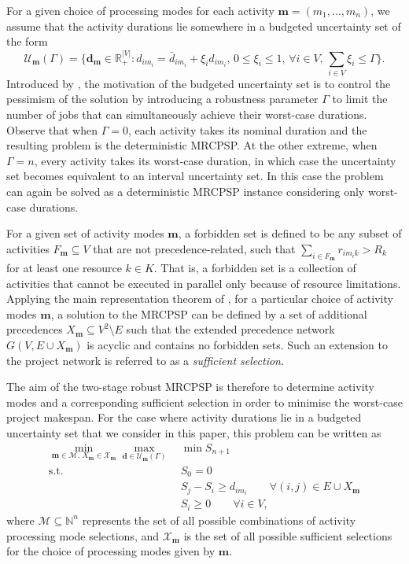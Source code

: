\documentclass[a4paper,abstracton]{scrartcl}
\newcommand{\M}{{\mathcal{M}}}
\newcommand{\U}{{\mathcal{U}}}
\newcommand{\X}{{\mathcal{X}}}
\begin{document}
For a given choice of processing modes for each activity $\bm{m}=(m_1,\dots,m_n)$, we assume that the activity durations lie somewhere in a budgeted uncertainty set of the form
$$\U_{\bm{m}}(\Gamma)=\Bigg\{\bm{d}_{\bm{m}}\in\mathbb{R}_+^{|V|}:d_{im_i}=\bar{d}_{im_i}+\xi_i\hat{d}_{im_i},\,0\leq \xi_i \leq 1,\,\forall i\in V,\,\sum_{i\in V}\xi_i \leq \Gamma\Bigg\}.$$
Introduced by \cite{bertsimas2004price}, the motivation of the budgeted uncertainty set is to control the pessimism of the solution by introducing a robustness parameter $\Gamma$ to limit the number of jobs that can simultaneously achieve their worst-case durations. Observe that when $\Gamma=0$, each activity takes its nominal duration and the resulting problem is the deterministic MRCPSP. At the other extreme, when $\Gamma=n$, every activity takes its worst-case duration, in which case the uncertainty set becomes equivalent to an interval uncertainty set. In this case the problem can again be solved as a deterministic MRCPSP instance considering only worst-case durations.

For a given set of activity modes $\bm{m}$, a forbidden set is defined to be any subset of activities $F_{\bm{m}}\subseteq V$ that are not precedence-related, such that $\sum_{i\in F_{\bm{m}}}r_{im_ik}>R_k$ for at least one resource $k\in K$. That is, a forbidden set is a collection of activities that cannot be executed in parallel only because of resource limitations. Applying the main representation theorem of \cite{bartusch1988scheduling}, for a particular choice of activity modes $\bm{m}$, a solution to the MRCPSP can be defined by a set of additional precedences $X_{\bm{m}}\subseteq V^2\setminus E$ such that the extended precedence network $G(V,E\cup X_{\bm{m}})$ is acyclic and contains no forbidden sets. Such an extension to the project network is referred to as a \textit{sufficient selection}.

The aim of the two-stage robust MRCPSP is therefore to determine activity modes and a corresponding sufficient selection in order to minimise the worst-case project makespan. For the case where activity durations lie in a budgeted uncertainty set that we consider in this paper, this problem can be written as
\begin{align}
	\min_{\bm{m}\in \M,\,X_{\bm{m}}\in \X_{\bm{m}}} \max_{\bm{d}\in\U_{\bm{m}}(\Gamma)}\ & \min S_{n+1}\label{eqn:robust_mrcpsp_1}\\
	\text{s.t. } & S_0 = 0\\
	& S_j - S_i \geq d_{im_i} \qquad \forall (i,j)\in E\cup X_{\bm{m}}\\
	& S_i \geq 0 \qquad \forall i\in V,\label{eqn:robust_mrcpsp_4}
\end{align}
where $\M\subseteq \mathbb{N}^n$ represents the set of all possible combinations of activity processing mode selections, and $\X_{\bm{m}}$ is the set of all possible sufficient selections for the choice of processing modes given by $\bm{m}$. 
\end{document}
